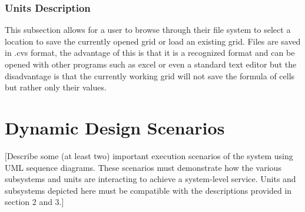 \documentclass[12pt]{article}
\begin{document}
\subsubsection{Units Description}
This subsection allows for a user to browse through their file system to select a location to save the currently opened grid or load an existing grid. Files are saved in .cvs format, the advantage of this is that it is a recognized format and can be opened with other programs such as excel or even a standard text editor but the disadvantage is that the currently working grid will not save the formula of cells but rather only their values. 

\section{Dynamic Design Scenarios}
[Describe some (at least two) important execution scenarios of the system using UML sequence diagrams. These scenarios must demonstrate how the various subsystems and units are interacting to achieve a system-level service. Units and subsystems depicted here must be compatible with the descriptions provided in section 2 and 3.]  
\end{document}
